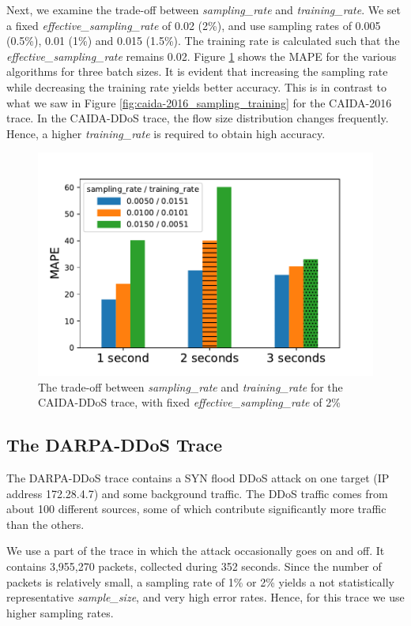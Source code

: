 		Next, we examine the trade-off between \emph{sampling\_rate} and \emph{training\_rate}. We set a fixed \emph{effective\_sampling\_rate} of 0.02 (2\%), and use sampling rates of 0.005 (0.5\%), 0.01 (1\%) and 0.015 (1.5\%). The training rate is calculated such that the \emph{effective\_sampling\_rate} remains 0.02. Figure \ref{fig:caida-ddos_sampling_training} shows the MAPE for the various algorithms for three batch sizes. It is evident that increasing the sampling rate while decreasing the training rate yields better accuracy. This is in contrast to what we saw in Figure \ref{fig:caida-2016_sampling_training} for the CAIDA-2016 trace. In the CAIDA-DDoS trace, the flow size distribution changes frequently. Hence, a higher \emph{training\_rate} is required to obtain high accuracy.
		\begin{figure}[!t]
			\centering
			\includegraphics[width=.49\textwidth]{img/caida-ddos_tradeoff.pdf}
			\caption{The trade-off between \emph{sampling\_rate} and \emph{training\_rate} for the CAIDA-DDoS trace, with fixed \emph{effective\_sampling\_rate} of 2\%}
			\label{fig:caida-ddos_sampling_training}
		\end{figure}

	\subsection{The DARPA-DDoS Trace}

		The DARPA-DDoS trace \cite{darpaddos} contains a SYN flood DDoS attack on one target (IP address 172.28.4.7) and some background traffic. The DDoS traffic comes from about 100 different sources, some of which contribute significantly more traffic than the others.
		
		We use a part of the trace in which the attack occasionally goes on and off. It contains 3,955,270 packets, collected during 352 seconds. Since the number of packets is relatively small, a sampling rate of 1\% or 2\% yields a not statistically representative \emph{sample\_size}, and very high error rates. Hence, for this trace we use higher sampling rates.%
		
